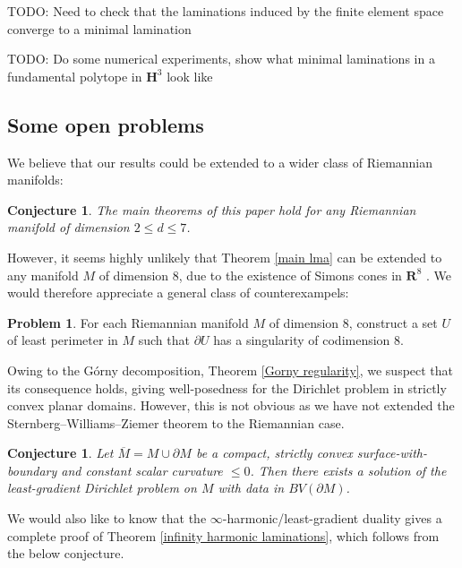 \documentclass[reqno,10pt]{amsart}
\newcommand{\RR}{\mathbf{R}}
\newcommand{\Hyp}{\mathbf H}
\newtheorem{conjecture}[theorem]{Conjecture}
\theoremstyle{definition}
\newtheorem{problem}[theorem]{Problem}
\numberwithin{equation}{section}
\begin{document}
TODO: Need to check that the laminations induced by the finite element space converge to a minimal lamination

TODO: Do some numerical experiments, show what minimal laminations in a fundamental polytope in $\Hyp^3$ look like



\subsection{Some open problems}
We believe that our results could be extended to a wider class of Riemannian manifolds:

\begin{conjecture}\label{main conj}
The main theorems of this paper hold for any Riemannian manifold of dimension $2 \leq d \leq 7$.
\end{conjecture}

However, it seems highly unlikely that Theorem \ref{main lma} can be extended to any manifold $M$ of dimension $8$, due to the existence of Simons cones in $\RR^8$ \cite[Theorem A]{BOMBIERI1969}.
We would therefore appreciate a general class of counterexampels:

\begin{problem}
For each Riemannian manifold $M$ of dimension $8$, construct a set $U$ of least perimeter in $M$ such that $\partial U$ has a singularity of codimension $8$.
\end{problem}

Owing to the G\'orny decomposition, Theorem \ref{Gorny regularity}, we suspect that its consequence \cite[Theorem 1.1]{górny2017planar} holds, giving well-posedness for the Dirichlet problem in strictly convex planar domains.
However, this is not obvious as we have not extended the Sternberg--Williams--Ziemer theorem \cite{ZiemerWilliamsSternberg1992} to the Riemannian case.

\begin{conjecture}
Let $\overline M = M \cup \partial M$ be a compact, strictly convex surface-with-boundary and constant scalar curvature $\leq 0$.
Then there exists a solution of the least-gradient Dirichlet problem on $M$ with data in $BV(\partial M)$.
\end{conjecture}

We would also like to know that the $\infty$-harmonic/least-gradient duality gives a complete proof of Theorem \ref{infinity harmonic laminations}, which follows from the below conjecture.
\end{document}

